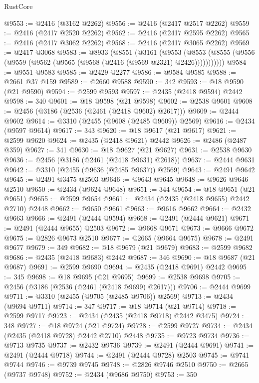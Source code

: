 \begin{lexlean}{RustCore}
\begin{coremodule}
@9553 := @2416 (@3162 @2262)
@9556 := @2416 (@2417 @2517 @2262)
@9559 := @2416 (@2417 @2520 @2262)
@9562 := @2416 (@2417 @2595 @2262)
@9565 := @2416 (@2417 @3062 @2262)
@9568 := @2416 (@2417 @3065 @2262)
@9569 := @2417 @3068
@9583 := @8933
    (@8551
      (@3161
        (@9553
          (@8553 (@8555 (@9556 (@9559 (@9562 (@9565 (@9568 (@2416 (@9569 @2321) @2426)))))))))))
@9584 := @9551 @9583
@9585 := @2429 @2277
@9586 := @9584 @9585
@9588 := @2661 @37 @159
@9589 := @2660 @9588
@9590 := 342
@9593 := @18 @9590 (@21 @9590)
@9594 := @2599 @9593
@9597 := @2435 (@2418 @9594) @2442
@9598 := 340
@9601 := @18 @9598 (@21 @9598)
@9602 := @2538 @9601
@9608 := @2456 (@3186 (@2536 (@2461 (@2418 @9602) @2617)))
@9609 := @2444 @9602
@9614 := @3310 (@2455 (@9608 (@2485 @9609)) @2569)
@9616 := @2434 (@9597 @9614)
@9617 := 343
@9620 := @18 @9617 (@21 @9617)
@9621 := @2599 @9620
@9624 := @2435 (@2418 @9621) @2442
@9626 := @2486 (@2487 @359)
@9627 := 341
@9630 := @18 @9627 (@21 @9627)
@9631 := @2538 @9630
@9636 := @2456 (@3186 (@2461 (@2418 @9631) @2618))
@9637 := @2444 @9631
@9642 := @3310 (@2455 (@9636 (@2485 @9637)) @2569)
@9643 := @2491 @9642
@9645 := @2491 @3475 @2503
@9646 := @9643 @9645
@9648 := @9626 @9646 @2510
@9650 := @2434 (@9624 @9648)
@9651 := 344
@9654 := @18 @9651 (@21 @9651)
@9655 := @2599 @9654
@9661 := @2434 (@2435 (@2418 @9655) @2442 @2710) @2448
@9662 := @9650 @9661
@9663 := @9616 @9662
@9664 := @2432 @9663
@9666 := @2491 (@2444 @9594)
@9668 := @2491 (@2444 @9621)
@9671 := @2491 (@2444 @9655) @2503
@9672 := @9668 @9671
@9673 := @9666 @9672
@9675 := @2826 @9673 @2510
@9677 := @2665 (@9664 @9675)
@9678 := @2491 @9677
@9679 := 349
@9682 := @18 @9679 (@21 @9679)
@9683 := @2599 @9682
@9686 := @2435 (@2418 @9683) @2442
@9687 := 346
@9690 := @18 @9687 (@21 @9687)
@9691 := @2599 @9690
@9694 := @2435 (@2418 @9691) @2442
@9695 := 345
@9698 := @18 @9695 (@21 @9695)
@9699 := @2538 @9698
@9705 := @2456 (@3186 (@2536 (@2461 (@2418 @9699) @2617)))
@9706 := @2444 @9699
@9711 := @3310 (@2455 (@9705 (@2485 @9706)) @2569)
@9713 := @2434 (@9694 @9711)
@9714 := 347
@9717 := @18 @9714 (@21 @9714)
@9718 := @2599 @9717
@9723 := @2434 (@2435 (@2418 @9718) @2442 @3475)
@9724 := 348
@9727 := @18 @9724 (@21 @9724)
@9728 := @2599 @9727
@9734 := @2434 (@2435 (@2418 @9728) @2442 @2710) @2448
@9735 := @9723 @9734
@9736 := @9713 @9735
@9737 := @2432 @9736
@9739 := @2491 (@2444 @9691)
@9741 := @2491 (@2444 @9718)
@9744 := @2491 (@2444 @9728) @2503
@9745 := @9741 @9744
@9746 := @9739 @9745
@9748 := @2826 @9746 @2510
@9750 := @2665 (@9737 @9748)
@9752 := @2434 (@9686 @9750)
@9753 := 350

\end{coremodule}
\end{lexlean}
